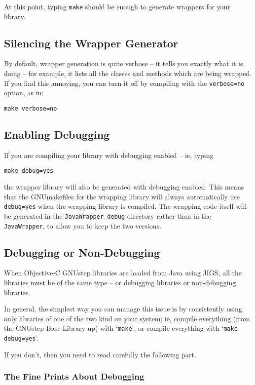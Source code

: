 At this point, typing \texttt{make} should be enough to generate
wrappers for your library.  

\subsection{Silencing the Wrapper Generator}

By default, wrapper generation is quite verbose -- it tells you
exactly what it is doing -- for example, it lists all the classes and
methods which are being wrapped.  If you find this annoying, you can
turn it off by compiling with the \texttt{verbose=no} option, as in:
\begin{verbatim}
make verbose=no
\end{verbatim}

\subsection{Enabling Debugging}

If you are compiling your library with debugging enabled  -- ie, typing
\begin{verbatim}
make debug=yes
\end{verbatim}
the wrapper library will also be generated with debugging enabled.
This means that the GNUmakefiles for the wrapping library will
always automatically use \texttt{debug=yes} when the wrapping library
is compiled.  The wrapping code itself will be generated in the
\texttt{JavaWrapper\_debug} directory rather than in the \texttt{JavaWrapper}, 
to allow you to keep the two versions.

\subsection{Debugging or Non-Debugging}

When Objective-C GNUstep libraries are loaded from Java using JIGS,
all the libraries must be of the same type -- or debugging libraries
or non-debugging libraries.  

In general, the simplest way you can manage this issue is by
consistently using only libraries of one of the two kind on your
system; ie, compile everything (from the GNUstep Base Library up) with
`\texttt{make}', or compile everything with `\texttt{make debug=yes}'.

If you don't, then you need to read carefully the following part.

\subsubsection{The Fine Prints About Debugging}

